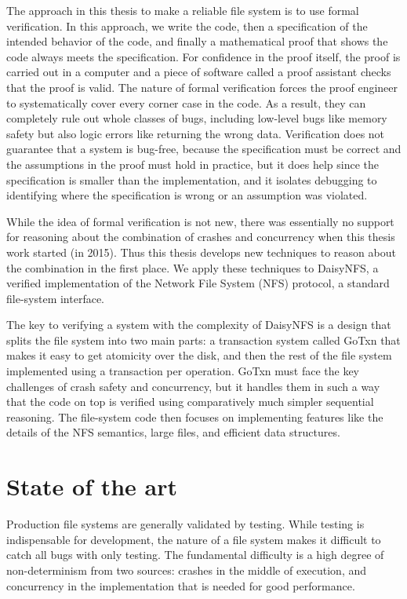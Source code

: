 The approach in this thesis to make a reliable file system is to use formal
verification. In this approach, we write the code, then a specification of the
intended behavior of the code, and finally a mathematical proof that shows the
code always meets the specification. For confidence in the proof itself, the
proof is carried out in a computer and a piece of software called a proof
assistant checks that the proof is valid. The nature of formal verification
forces the proof engineer to systematically cover every corner case in the code.
As a result, they can completely rule out whole classes of bugs, including
low-level bugs like memory safety but also logic errors like returning the wrong
data. Verification does not guarantee that a system is bug-free, because the
specification must be correct and the assumptions in the proof must hold in
practice, but it does help since the specification is smaller than the
implementation, and it isolates debugging to identifying where the specification
is wrong or an assumption was violated.

While the idea of formal verification is not new, there was essentially no
support for reasoning about the combination of crashes and concurrency when this
thesis work started (in 2015). Thus this thesis develops new techniques to
reason about the combination in the first place. We apply these techniques to
DaisyNFS, a verified implementation of the Network File System (NFS) protocol, a
standard file-system interface.

The key to verifying a system with the complexity of DaisyNFS is a design
that splits the file system into two main parts: a transaction system called
GoTxn that makes it easy to get atomicity over the disk, and then the rest of
the file system implemented using a transaction per operation. GoTxn must face
the key challenges of crash safety and concurrency, but it handles them in such
a way that the code on top is verified using comparatively much simpler
sequential reasoning. The file-system code then focuses on implementing features
like the details of the NFS semantics, large files, and efficient data
structures.

\section{State of the art}
\label{sec:intro:related}

Production file systems are generally validated by testing. While testing is
indispensable for development, the nature of a file system makes it difficult to
catch all bugs with only testing. The fundamental difficulty is a high degree of
non-determinism from two sources: crashes in the middle of execution, and
concurrency in the implementation that is needed for good performance.

